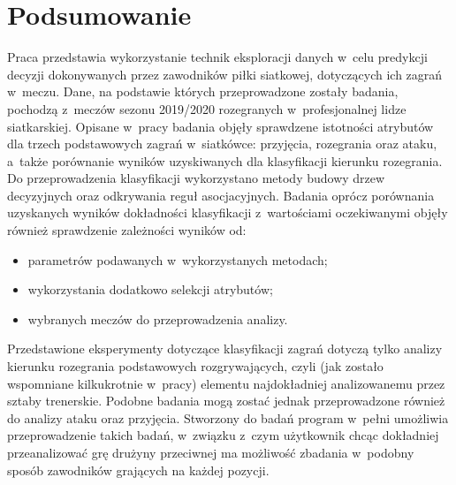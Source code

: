 \documentclass[a4paper,twoside,12pt]{book}
\begin{document}
\chapter{Podsumowanie}
\label{roz:podsumowanie}
Praca przedstawia wykorzystanie technik eksploracji danych w~celu predykcji decyzji dokonywanych przez zawodników piłki siatkowej, dotyczących ich zagrań w~meczu. Dane, na podstawie których przeprowadzone zostały badania, pochodzą z~meczów sezonu 2019/2020 rozegranych w~profesjonalnej lidze siatkarskiej. Opisane w~pracy badania objęły sprawdzene istotności atrybutów dla trzech podstawowych zagrań w~siatkówce: przyjęcia, rozegrania oraz ataku, a~także porównanie wyników uzyskiwanych dla klasyfikacji kierunku rozegrania. Do przeprowadzenia klasyfikacji wykorzystano metody budowy drzew decyzyjnych oraz odkrywania reguł asocjacyjnych. Badania oprócz porównania uzyskanych wyników dokładności klasyfikacji z~wartościami oczekiwanymi objęły również sprawdzenie zależności wyników od: 
\begin{itemize}
\item parametrów podawanych w~wykorzystanych metodach;
\item wykorzystania dodatkowo selekcji atrybutów;
\item wybranych meczów do przeprowadzenia analizy.
\end{itemize}
Przedstawione eksperymenty dotyczące klasyfikacji zagrań dotyczą tylko analizy kierunku rozegrania podstawowych rozgrywających, czyli (jak zostało wspomniane kilkukrotnie w~pracy) elementu najdokładniej analizowanemu przez sztaby trenerskie. Podobne badania mogą zostać jednak przeprowadzone również do analizy ataku oraz przyjęcia. Stworzony do badań program w~pełni umożliwia przeprowadzenie takich badań, w~związku z~czym użytkownik chcąc dokładniej przeanalizować grę drużyny przeciwnej ma możliwość zbadania w~podobny sposób zawodników grających na każdej pozycji.
\end{document}
